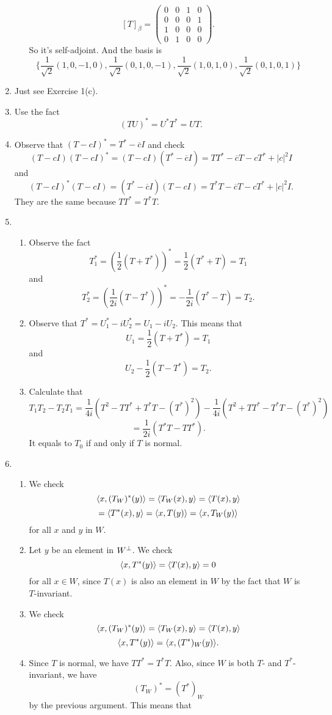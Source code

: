 \begin{enumerate}
\begin{enumerate}
\[[T]_{\beta}=\begin{pmatrix}0&0&1&0\\0&0&0&1\\1&0&0&0\\0&1&0&0\end{pmatrix}.\]
So it's self-adjoint. And the basis is 
\[\{\frac{1}{\sqrt{2}}(1,0,-1,0),\frac{1}{\sqrt{2}}(0,1,0,-1),\frac{1}{\sqrt{2}}(1,0,1,0),\frac{1}{\sqrt{2}}(0,1,0,1)\}\]
\end{enumerate}
\item Just see Exercise 1(c).
\item Use the fact 
\[(TU)^*=U^*T^*=UT.\]
\item Observe that $(T-cI)^*=T^*-\overline{c}I$ and check 
\[(T-cI)(T-cI)^*=(T-cI)(T^*-\overline{c}I)=TT^*-\overline{c}T-cT^*+|c|^2I\]
and 
\[(T-cI)^*(T-cI)=(T^*-\overline{c}I)(T-cI)=T^*T-\overline{c}T-cT^*+|c|^2I.\]
They are the same because $TT^*=T^*T$.
\item \begin{enumerate}
\item Observe the fact 
\[T_1^*=(\frac{1}{2}(T+T^*))^*=\frac{1}{2}(T^*+T)=T_1\]
and 
\[T_2^*=(\frac{1}{2i}(T-T^*))^*=-\frac{1}{2i}(T^*-T)=T_2.\]
\item Observe that $T^*=U_1^*-iU_2^*=U_1-iU_2$. This means that 
\[U_1=\frac{1}{2}(T+T^*)=T_1\]
and 
\[U_2-\frac{1}{2}(T-T^*)=T_2.\]
\item Calculate that 
\[T_1T_2-T_2T_1=\frac{1}{4i}(T^2-TT^*+T^*T-(T^*)^2)-\frac{1}{4i}(T^2+TT^*-T^*T-(T^*)^2)\]
\[=\frac{1}{2i}(T^*T-TT^*).\]
It equals to $T_0$ if and only if $T$ is normal.
\end{enumerate}
\item 
\begin{enumerate}
\item We check 
\[\langle x,(T_W)^*(y)\rangle =\langle T_W(x),y\rangle =\langle T(x),y\rangle \]
\[=\langle T^*(x),y\rangle =\langle x,T(y)\rangle =\langle x,T_W(y)\rangle \]
for all $x$ and $y$ in $W$.
\item Let $y$ be an element in $W^{\perp}$. We check 
\[\langle x,T^*(y)\rangle =\langle T(x),y\rangle =0\]
for all $x\in W$, since $T(x)$ is also an element in $W$ by the fact that $W$ is $T$-invariant.
\item We check 
\[\langle x,(T_W)^*(y)\rangle =\langle T_W(x),y\rangle =\langle T(x),y\rangle \]
\[\langle x,T^*(y)\rangle =\langle x,(T^*)_W(y)\rangle .\]
\item Since $T$ is normal, we have $TT^*=T^*T$. Also, since $W$ is both $T$- and $T^*$-invariant, we have 
\[(T_W)^*=(T^*)_W\]
by the previous argument. This means that 

\end{enumerate}
\end{enumerate}
